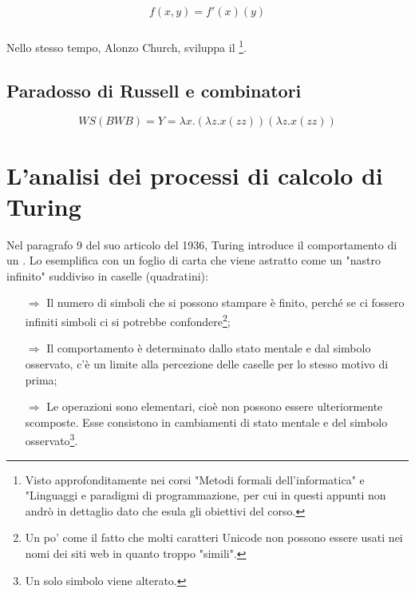 $$f(x, y) = f'(x)(y)$$

\subsubsection*{}

Nello stesso tempo, Alonzo Church, sviluppa il \footnote{Visto approfonditamente nei corsi 
"Metodi formali dell'informatica" e "Linguaggi e paradigmi di programmazione, per cui in questi appunti non andrò
in dettaglio dato che esula gli obiettivi del corso.}.


\subsection{Paradosso di Russell e combinatori}

$$WS(BWB) = Y = \lambda x.(\lambda z.x(zz)) (\lambda z.x(zz))$$



\section{L'analisi dei processi di calcolo di Turing}

Nel paragrafo 9 del suo articolo del 1936, Turing introduce
il comportamento di un . Lo esemplifica con un
foglio di carta che viene astratto come un "nastro infinito" suddiviso in
caselle (quadratini):
\begin{itemize}
    \item [$\Rightarrow$] Il numero di simboli che si possono stampare è finito,
    perché se ci fossero infiniti simboli ci si potrebbe confondere\footnote{Un po'
    come il fatto che molti caratteri Unicode non possono essere usati nei
    nomi dei siti web in quanto troppo "simili".};
    \item [$\Rightarrow$] Il comportamento è determinato dallo stato mentale
    e dal simbolo osservato, c'è un limite alla percezione delle caselle per lo stesso
    motivo di prima;
    \item [$\Rightarrow$] Le operazioni sono elementari, cioè non possono essere
    ulteriormente scomposte. Esse consistono in cambiamenti di stato mentale e  
    del simbolo osservato\footnote{Un solo simbolo viene alterato.}.
\end{itemize}

